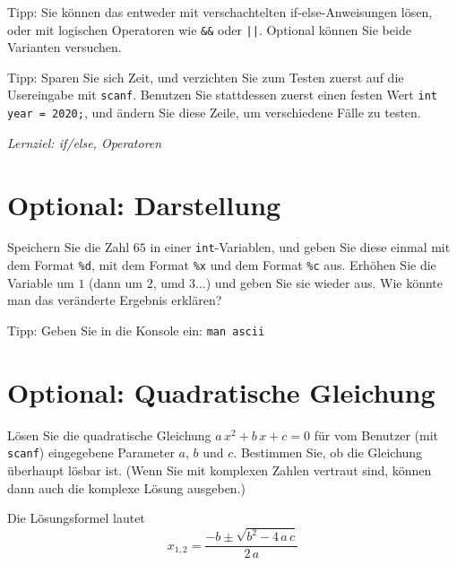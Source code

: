\documentclass[
	ngerman,
	fontsize=10pt,
	parskip=half,
	titlepage=true,
	DIV=12
]{scrartcl}
\newcommand*{\inC}[1]{\texttt{#1}}
\begin{document}
Tipp: Sie können das entweder mit verschachtelten if-else-Anweisungen lösen,
oder mit logischen Operatoren wie \texttt{\&\&} oder \texttt{||}.
Optional können Sie beide Varianten versuchen.

Tipp: Sparen Sie sich Zeit, und verzichten Sie zum Testen zuerst auf die Usereingabe mit \inC{scanf}. Benutzen Sie stattdessen zuerst einen festen Wert \inC{int year = 2020;}, und ändern Sie diese Zeile, um verschiedene Fälle zu testen.

\emph{Lernziel: if/else, Operatoren}


\section{Optional: Darstellung}
Speichern Sie die Zahl $65$ in einer \inC{int}-Variablen,
und geben Sie diese einmal mit dem Format \texttt{\%d},
mit dem Format \verb`%x` und dem Format \verb`%c` aus.
Erhöhen Sie die Variable um $1$ (dann um $2$, umd $3$...)
und geben Sie sie wieder aus. 
Wie könnte man das veränderte Ergebnis erklären?

Tipp: Geben Sie in die Konsole ein: \texttt{man ascii}


\section{Optional: Quadratische Gleichung}
Lösen Sie die quadratische Gleichung $a\,x^2+b\,x+c=0$ für vom Benutzer
(mit \texttt{scanf}) eingegebene Parameter $a$, $b$ und $c$.
Bestimmen Sie, ob die Gleichung überhaupt lösbar ist.
(Wenn Sie mit komplexen Zahlen vertraut sind, können dann
auch die komplexe Lösung ausgeben.)

Die Lösungsformel lautet
\[x_{1,2} = \frac{-b \pm \sqrt{b^2 - 4\,a\,c}}{2\,a}\]
\end{document}
